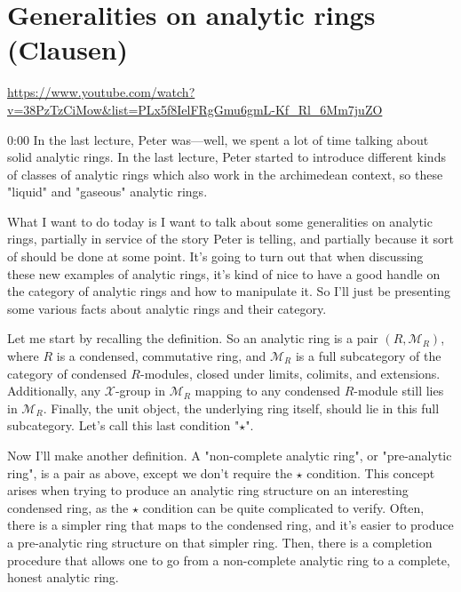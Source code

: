 
\section{\ufs Generalities on analytic rings (Clausen)}
\label{sec:13-analytic-rings}

\url{https://www.youtube.com/watch?v=38PzTzCiMow&list=PLx5f8IelFRgGmu6gmL-Kf_Rl_6Mm7juZO}
\renewcommand{\yt}[2]{\href{https://www.youtube.com/watch?v=38PzTzCiMow&list=PLx5f8IelFRgGmu6gmL-Kf_Rl_6Mm7juZO&t=#1}{#2}}
\vspace{1em}

\begin{unfinished}{0:00}
In the last lecture, Peter was---well, we spent a lot of time talking about solid analytic rings. In the last lecture, Peter started to introduce different kinds of classes of analytic rings which also work in the archimedean context, so these "liquid" and "gaseous" analytic rings.

What I want to do today is I want to talk about some generalities on analytic rings, partially in service of the story Peter is telling, and partially because it sort of should be done at some point. It's going to turn out that when discussing these new examples of analytic rings, it's kind of nice to have a good handle on the category of analytic rings and how to manipulate it. So I'll just be presenting some various facts about analytic rings and their category.

Let me start by recalling the definition. So an analytic ring is a pair $(R, \mathcal{M}_R)$, where $R$ is a condensed, commutative ring, and $\mathcal{M}_R$ is a full subcategory of the category of condensed $R$-modules, closed under limits, colimits, and extensions. Additionally, any $\mathcal{X}$-group in $\mathcal{M}_R$ mapping to any condensed $R$-module still lies in $\mathcal{M}_R$. Finally, the unit object, the underlying ring itself, should lie in this full subcategory. Let's call this last condition "$\star$".

Now I'll make another definition. A "non-complete analytic ring", or "pre-analytic ring", is a pair as above, except we don't require the $\star$ condition. This concept arises when trying to produce an analytic ring structure on an interesting condensed ring, as the $\star$ condition can be quite complicated to verify. Often, there is a simpler ring that maps to the condensed ring, and it's easier to produce a pre-analytic ring structure on that simpler ring. Then, there is a completion procedure that allows one to go from a non-complete analytic ring to a complete, honest analytic ring.


\end{unfinished}
